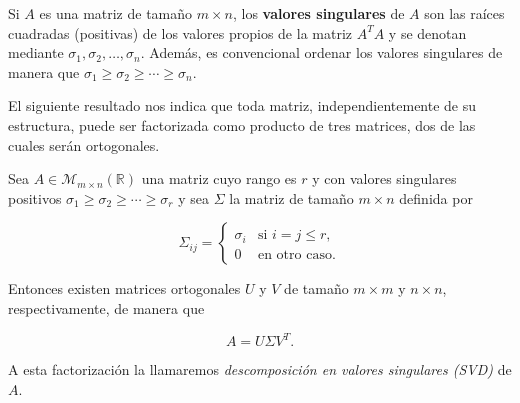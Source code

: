 \begin{definicion}
    Si $A$ es una matriz de tamaño $m \times n$, los \textbf{valores singulares} de $A$ son las raíces cuadradas (positivas) de los valores propios de la matriz $A^{T}A$ y se denotan mediante $\sigma_{1}, \sigma_{2}, \ldots, \sigma_{n}$. Además, es convencional ordenar los valores singulares de manera que $\sigma_{1} \geq \sigma_{2} \geq \cdots \geq \sigma_{n}$.\newline
\end{definicion}


El siguiente resultado nos indica que toda matriz, independientemente de su estructura, puede ser factorizada como producto de tres matrices, dos de las cuales serán ortogonales.

\begin{teorema}
    Sea $A \in \mathcal{M}_{m \times n}(\mathbb{R})$ una matriz cuyo rango es $r$ y con valores singulares positivos $\sigma_{1} \geq \sigma_{2} \geq \cdots \geq \sigma_{r}$ y sea $\Sigma$ la matriz de tamaño $m \times n$ definida por 

    \[
        \Sigma_{ij} =
        \begin{cases}
            \sigma_i & \text{si } i = j \leq r, \\
            0 & \text{en otro caso.}
        \end{cases}
    \]

    Entonces existen matrices ortogonales $U$ y $V$ de tamaño $m\times m$ y $n\times n$, respectivamente, de manera que

    \[
        A = U \Sigma V^{T}.
    \]

    A esta factorización la llamaremos \emph{descomposición en valores singulares (SVD)} de $A$.\newline
\end{teorema}

